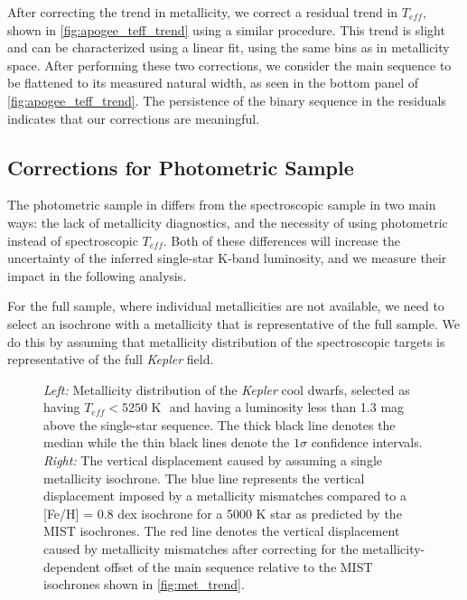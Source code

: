 \documentclass[manuscript]{aastex6}
\newcommand{\Kepler}{\mbox{\textit{Kepler}}}
\newcommand{\Teff}{\ensuremath{T_{eff}}}
\begin{document}
After correcting the trend in metallicity, we correct a residual trend in
\Teff{}, shown in \cref{fig:apogee_teff_trend} using a similar procedure. This 
trend is slight and can be characterized using a linear fit, using the same 
bins as in metallicity space. After performing these two corrections, we 
consider the main sequence to be flattened to its measured natural width, as
seen in the bottom panel of \cref{fig:apogee_teff_trend}. The persistence of 
the binary sequence in the residuals indicates that our corrections are 
meaningful.  

\subsection{Corrections for Photometric Sample}

The photometric sample in \citet{McQuillan14} differs from the spectroscopic
sample in two main ways: the lack of metallicity diagnostics, and the necessity
of using photometric instead of spectroscopic \Teff{}. Both of these
differences will increase the uncertainty of the inferred single-star K-band
luminosity, and we measure their impact in the following analysis.

For the full \citet{McQuillan14} sample, where individual metallicities are not
available, we need to select an isochrone with a metallicity that is 
representative of the full sample. We do this by assuming that metallicity 
distribution of the spectroscopic targets is representative of the full 
\Kepler{} field. 

\begin{figure}[htb]
    \centering
    \caption{\emph{Left:} Metallicity distribution of the \Kepler{} cool 
        dwarfs, selected as having \(\Teff < 5250 \textrm{ K }\) and having 
        a luminosity less than 1.3 mag above the single-star sequence. The 
        thick black line denotes the median while the thin black lines denote 
        the \(1\sigma\) confidence intervals. \emph{Right:} The vertical 
        displacement caused by assuming a single metallicity isochrone. The
blue line represents the vertical displacement imposed by a metallicity 
mismatches compared to a [Fe/H] = 0.8 dex isochrone for a 5000 K star as 
predicted by the MIST isochrones. The red line denotes the vertical 
displacement caused by metallicity mismatches after correcting for the 
metallicity-dependent offset of the main sequence relative to the MIST 
isochrones shown in \cref{fig:met_trend}.}\label{fig:metallicity}
\end{figure}
\end{document}
